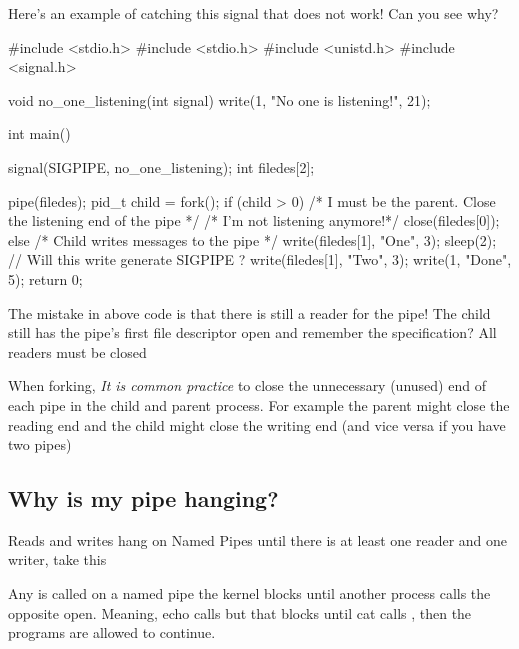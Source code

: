 \begin{enumerate}
Here's an example of catching this signal that does not work! Can you
see why?

\begin{code}[language=C]
#include <stdio.h>
#include <stdio.h>
#include <unistd.h>
#include <signal.h>

void no_one_listening(int signal) {
    write(1, "No one is listening!\n", 21);
}

int main() {
    signal(SIGPIPE, no_one_listening);
    int filedes[2];
    
    pipe(filedes);
    pid_t child = fork();
    if (child > 0) { 
        /* I must be the parent. Close the listening end of the pipe */
        /* I'm not listening anymore!*/
        close(filedes[0]);
    } else {
        /* Child writes messages to the pipe */
        write(filedes[1], "One", 3);
        sleep(2);
        // Will this write generate SIGPIPE ?
        write(filedes[1], "Two", 3);
        write(1, "Done\n", 5);
    }
    return 0;
}
\end{code}

The mistake in above code is that there is still a reader for the pipe! The child still has the pipe's first file descriptor open and remember the specification? All readers must be closed 

When forking, \emph{It is common practice} to close the unnecessary (unused) end of each pipe in the child and parent process. For example the parent might close the reading end and the child might close the writing end (and vice versa if you have two pipes)

\subsection{Why is my pipe hanging?}\label{why-is-my-pipe-hanging}

Reads and writes hang on Named Pipes until there is at least one reader and one writer, take this


Any  is called on a named pipe the kernel blocks until another process calls the opposite open. Meaning, echo calls  but that blocks until cat calls , then the programs are allowed to continue.


\end{enumerate}
